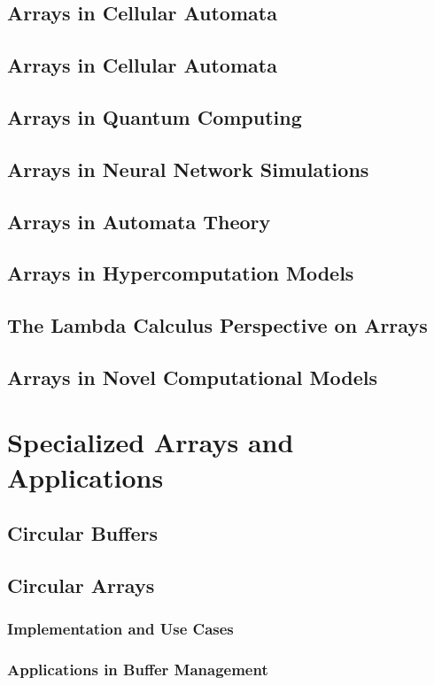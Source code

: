 \documentclass[12pt, oneside]{book}
\begin{document}
	\section{Arrays in Cellular Automata}
	\section{Arrays in Cellular Automata}
	\section{Arrays in Quantum Computing}
	\section{Arrays in Neural Network Simulations}
	\section{Arrays in Automata Theory}
	\section{Arrays in Hypercomputation Models}
	\section{The Lambda Calculus Perspective on Arrays}
	\section{Arrays in Novel Computational Models}
	
	\chapter{Specialized Arrays and Applications}
	\section{Circular Buffers}
	\section{Circular Arrays}
	\subsection{Implementation and Use Cases}
	\subsection{Applications in Buffer Management}
	
\end{document}

